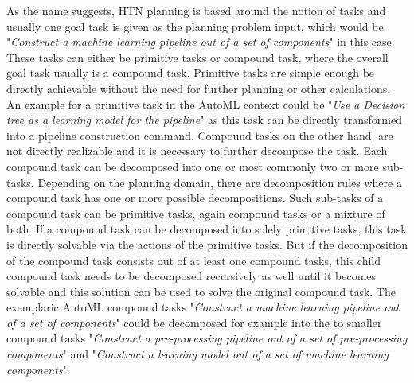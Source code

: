 As the name suggests, HTN planning is based around the notion of tasks and usually one goal task is given as the planning problem input, which would be "\textit{Construct a machine learning pipeline out of a set of components}" in this case.
These tasks can either be primitive tasks or compound task, where the overall goal task usually is a compound task.
Primitive tasks are simple enough be directly achievable without the need for further planning or other calculations.
An example for a primitive task in the AutoML context could be "\textit{Use a Decision tree as a learning model for the pipeline}" as this task can be directly transformed into a pipeline construction command.\newline
Compound tasks on the other hand, are not directly realizable and it is necessary to further decompose the task.
Each compound task can be decomposed into one or most commonly two or more sub-tasks.
Depending on the planning domain, there are decomposition rules where a compound task has one or more possible decompositions.
Such sub-tasks of a compound task can be primitive tasks, again compound tasks or a mixture of both.
If a compound task can be decomposed into solely primitive tasks, this task is directly solvable via the actions of the primitive tasks.
But if the decomposition of the compound task consists out of at least one compound tasks, this child compound task needs to be decomposed recursively as well until it becomes solvable and this solution can be used to solve the original compound task.
The exemplaric AutoML compound tasks "\textit{Construct a machine learning pipeline out of a set of components}" could be decomposed for example into the to smaller compound tasks "\textit{Construct a pre-processing pipeline out of a set of pre-processing components}" and "\textit{Construct a learning model out of a set of machine learning components}".

